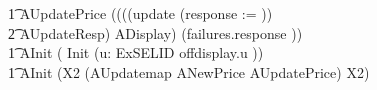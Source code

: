 \begin{circus}

        \t1 AUpdatePrice \circdef ((((update \then (response := \emptyset)) \circseq \\
            \t2 AUpdateResp) \circseq ADisplay) \circseq (failures.response \then \Skip)) \\

    \t1 AInit \circdef ( Init \circseq (\Interleave u: ExSELID \circspot offdisplay.u \then \Skip)) \\

	\t1 \circspot AInit \circseq (\circmu X2 \circspot (AUpdatemap \extchoice ANewPrice \extchoice AUpdatePrice) \circseq X2) \\
	\circend
\end{circus}

